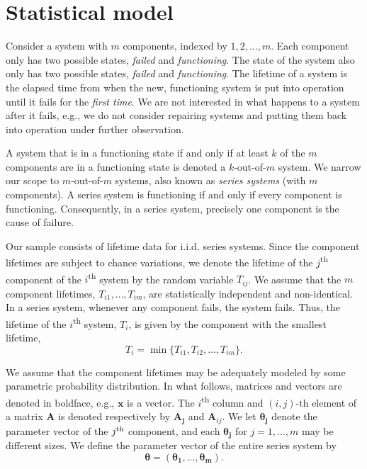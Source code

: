 \documentclass[
]{article}
\begin{document}
\hypertarget{sec:statmod}{%
\section{Statistical model}\label{sec:statmod}}

Consider a system with \(m\) components, indexed by \(1,2,\ldots,m\).
Each component only has two possible states, \emph{failed} and
\emph{functioning}. The state of the system also only has two possible
states, \emph{failed} and \emph{functioning}. The lifetime of a system
is the elapsed time from when the new, functioning system is put into
operation until it fails for the \emph{first time}. We are not
interested in what happens to a system after it fails, e.g., we do not
consider repairing systems and putting them back into operation under
further observation.

A system that is in a functioning state if and only if at least \(k\) of
the \(m\) components are in a functioning state is denoted a
\(k\)-out-of-\(m\) system. We narrow our scope to \(m\)-out-of-\(m\)
systems, also known as \emph{series systems} (with \(m\) components). A
series system is functioning if and only if every component is
functioning. Consequently, in a series system, precisely one component
is the cause of failure.

Our sample consists of lifetime data for i.i.d. series systems. Since
the component lifetimes are subject to chance variations, we denote the
lifetime of the \(j\)\textsuperscript{th} component of the
\(i\)\textsuperscript{th} system by the random variable \(T_{i j}\). We
assume that the \(m\) component lifetimes, \(T_{i 1},\ldots,T_{i m}\),
are statistically independent and non-identical. In a series system,
whenever any component fails, the system fails. Thus, the lifetime of
the \(i\)\textsuperscript{th} system, \(T_i\), is given by the component
with the smallest lifetime, \[
    T_i = \min\bigr\{T_{i 1},T_{i 2}, \ldots, T_{i m} \bigr\}.
\]

We assume that the component lifetimes may be adequately modeled by some
parametric probability distribution. In what follows, matrices and
vectors are denoted in boldface, e.g., \(\boldsymbol{x}\) is a vector.
The \(i\)\textsuperscript{th} column and \((i,j)\)-th element of a
matrix \(\boldsymbol{A}\) is denoted respectively by
\(\boldsymbol{A_j}\) and \(\boldsymbol{A}_{i j}\). We let
\(\boldsymbol{\theta_j}\) denote the parameter vector of the
\(j\textsuperscript{th}\) component, and each \(\boldsymbol{\theta_j}\)
for \(j=1,\ldots,m\) may be different sizes. We define the parameter
vector of the entire series system by \[
    \boldsymbol{\theta }= (\boldsymbol{\theta_1},\ldots,\boldsymbol{\theta_m}).
\]
\end{document}

